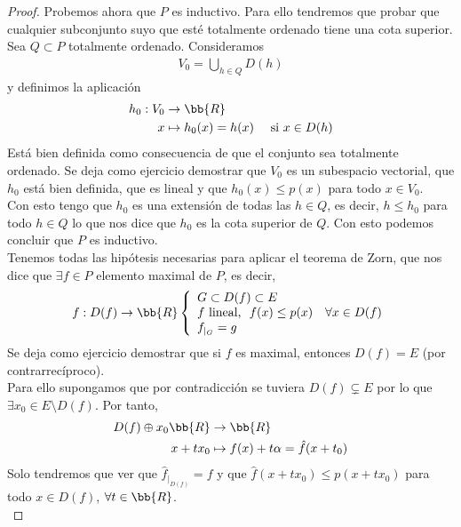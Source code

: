 \begin{teo}
\begin{proof}
        Probemos ahora que $P$ es inductivo. Para ello tendremos que probar que cualquier subconjunto suyo que esté totalmente ordenado tiene una cota superior. Sea $Q\subset P$ totalmente ordenado. Consideramos
        \begin{gather*}
            V_0 = \bigcup_{h\in Q}D(h)
        \end{gather*}
        y definimos la aplicación
        \begin{align*}
            h_0: V_0 &\to \bb{R}\\
            x &\mapsto h_0(x) = h(x) \ \ \ \text{ si } x\in D(h)
        \end{align*}
        Está bien definida como consecuencia de que el conjunto sea totalmente ordenado. Se deja como ejercicio demostrar que $V_0$ es un subespacio vectorial, que $h_0$ está bien definida, que es lineal y que $h_0(x)\leq p(x)$ para todo $x\in V_0$.\\

        Con esto tengo que $h_0$ es una extensión de todas las $h\in Q$, es decir, $h\leq h_0$ para todo $h\in Q$ lo que nos dice que $h_0$ es la cota superior de $Q$. Con esto podemos concluir que $P$ es inductivo.\\
        
        Tenemos todas las hipótesis necesarias para aplicar el teorema de Zorn, que nos dice que $\exists f \in P$ elemento maximal de $P$, es decir, 
        \begin{align*}
            f:D(f) \to \bb{R} \left\{
            \begin{array}{l}
                G\subset D(f)\subset E\\
                f\text{ lineal, }\ f(x)\leq p(x)\ \ \ \forall x \in D(f)\\
                f_{|_G} = g
            \end{array}
            \right.
        \end{align*}
        Se deja como ejercicio demostrar que si $f$ es maximal, entonces $D(f)=E$ (por contrarrecíproco).\\

        Para ello supongamos que por contradicción se tuviera $D(f) \varsubsetneq E$ por lo que $\exists x_0\in E\setminus D(f)$. Por tanto,
        \begin{align*}
            D(f) \oplus x_0 \bb{R} & \to \bb{R}\\
            x+tx_0 & \mapsto f(x) + t\alpha = \hat{f}(x+t_0)
        \end{align*}
        Solo tendremos que ver que $\hat{f}_{|_{D(f)}}=f$ y que $\hat{f}(x+tx_0)\leq p(x+tx_0)$ para todo $x\in D(f)$, $\forall t \in \bb{R}$.\\


\end{proof}
\end{teo}

